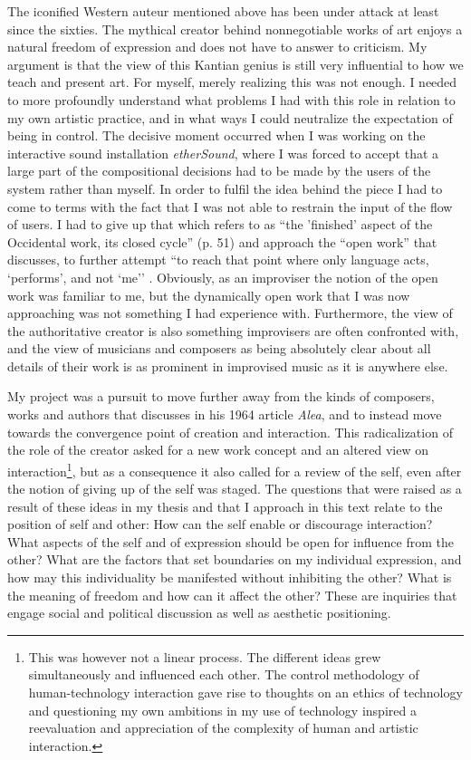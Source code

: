 \documentclass[a4paper]{article}
\begin{document}
The iconified Western auteur mentioned above has been under attack at least since the sixties. The mythical creator behind nonnegotiable works of art enjoys a natural freedom of expression and does not have to answer to criticism. My argument \citep{frisk08} is that the view of this Kantian genius is still very influential to how we teach and present art. For myself, merely realizing this was not enough. I needed to more profoundly understand what problems I had with this role in relation to my own artistic practice, and in what ways I could neutralize the expectation of being in control. The decisive moment occurred when I was working on the interactive sound installation \emph{etherSound}, where I was forced to accept that a large part of the compositional decisions had to be made by the users of the system rather than myself. In order to fulfil the idea behind the piece I had to come to terms with the fact that I was not able to restrain the input of the flow of users. I had to give up that which \citet{boulez64} refers to as ``the 'finished' aspect of the Occidental work, its closed cycle'' (p. 51) and approach the ``open work'' that \citet{eco68} discusses, to further attempt ``to reach that point where only language acts, `performs', and not `me'' \citep{barthes77}. Obviously, as an improviser the notion of the open work was familiar to me, but the dynamically open work that I was now approaching was not something I had experience with. Furthermore, the view of the authoritative creator is also something improvisers are often confronted with, and the view of musicians and composers as being absolutely clear about all details of their work is as prominent in improvised music as it is anywhere else. 

My project  was a pursuit to move further away from the kinds of composers, works and authors that \citet{boulez64} discusses in his 1964 article \emph{Alea}, and to instead move towards the convergence point of creation and interaction. This radicalization of the role of the creator asked for a new work concept and an altered view on interaction\footnote{This was however not a linear process. The different ideas grew simultaneously and influenced each other. The control methodology of human-technology interaction gave rise to thoughts on an ethics of technology and questioning my own ambitions in my use of technology inspired a reevaluation and appreciation of the complexity of human and artistic interaction.}, but as a consequence it also called for a review of the self, even after the notion of giving up of the self was staged. The questions that were raised as a result of these ideas in my thesis and that I approach in this text relate to the position of self and other: How can the self enable or discourage interaction? What aspects of the self and of expression should be open for influence from the other? What are the factors that set boundaries on my individual expression, and how may this individuality be manifested without inhibiting the other? What is the meaning of freedom and how can it affect the other? These are inquiries that engage social and political discussion as well as aesthetic positioning.
\end{document}
